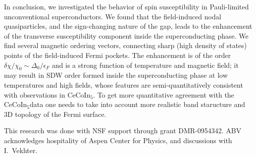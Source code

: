 \documentclass[aps,prl,twocolumn,showpacs,amsmath,amssymb]{revtex4-1}
\newcommand{\cecoin}{CeCoIn$_5$}
\begin{document}
%
In conclusion, we investigated the behavior of spin susceptibility in Pauli-limited 
unconventional superconductors. We found that the field-induced nodal quasiparticles, and the sign-changing 
nature of the gap, leads to the enhancement of the transverse susceptibility component 
inside the superconducting phase. 
We find several magnetic ordering vectors, connecting sharp (high density of states) points of the field-induced Fermi pockets. 
The enhancement is of the order $\delta\chi/\chi_0 \sim \Delta_0/\epsilon_F$ 
and is a strong function of temperature and magnetic field; 
it may result in SDW order formed inside the superconducting phase at low temperatures and 
high fields, whose features are semi-quantitatively consistent with observations in \cecoin.  
To get more quantitative agreement with the \cecoin data one needs to take into account 
more realistic band staructure and 3D topology of the Fermi surface. 

This research was done with NSF support through grant DMR-0954342. 
ABV acknowledges hospitality of Aspen Center for Physics, and discussions with 
I.~Vekhter. 



\end{document}
